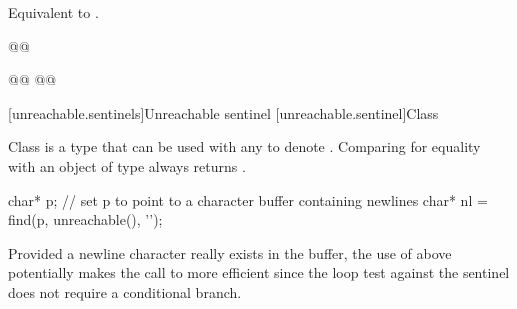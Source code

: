 \begin{addedblock}
\begin{itemdescr}
\pnum
\effects Equivalent to .

{\color{oldclr}
\pnum
{}
\begin{codeblock}
@@
\end{codeblock}
} %
\end{itemdescr}

{\color{oldclr}
%
\begin{itemdecl}
@@
  @@
\end{itemdecl}

\begin{itemdescr}
\pnum
{}

\pnum
{}
\end{itemdescr}
} %



[unreachable.sentinels]{Unreachable sentinel}
[unreachable.sentinel]{Class }

\pnum
{}%
Class  is a  type that can be
used with any  to
denote .
Comparing  for equality with an object of type
 always returns .

\pnum
\begin{example}
\begin{codeblock}
char* p;
// set p to point to a character buffer containing newlines
char* nl = find(p, unreachable(), '\n');
\end{codeblock}

Provided a newline character really exists in the buffer, the use of
 above potentially makes the call to  more
efficient since the loop test against the sentinel does not require a
conditional branch.
\end{example}


\end{addedblock}
